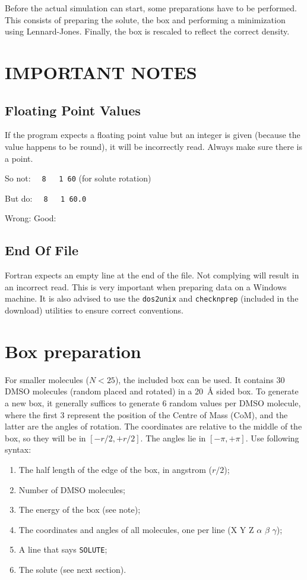 Before the actual simulation can start, some preparations have to be performed.
This consists of preparing the solute, the box and performing a minimization 
using Lennard-Jones. Finally, the box is rescaled to reflect the correct 
density.

\section{IMPORTANT NOTES}
\subsection{Floating Point Values}
If the program expects a floating point value but an integer is given (because 
the value happens to be round), it will be incorrectly read. Always make sure 
there is a point.

So not: \verb|  8   1 60| (for solute rotation)

But do: \verb|  8   1 60.0|

Wrong: \vispace{} \vispace\vispace{} 
 Good: \vispace{} \vispace\vispace{} 

\subsection{End Of File}
Fortran expects an empty line at the end of the file. Not complying will result 
in an incorrect read. This is very important when preparing data on a Windows 
machine. It is also advised to use the \verb|dos2unix| and \verb|checknprep| 
(included in the download) utilities to ensure correct conventions.

\section{Box preparation}
For smaller molecules ($N < 25$), the included box can be used. It contains 30 
DMSO molecules (random placed and rotated) in a \SI{20}{\angstrom} sided box.
To generate a new box, it generally suffices to generate 6 random values per 
DMSO molecule, where the first 3 represent the position of the Centre of Mass 
(CoM), and the latter are the angles of rotation. The coordinates are relative 
to the middle of the box, so they will be in $[-r/2, +r/2]$. The angles lie in 
$[-\pi, +\pi]$. Use following syntax:

\begin{enumerate}
	\item The half length of the edge of the box, in angstrom ($r/2$);
	\item Number of DMSO molecules;
	\item The energy of the box (see note);
	\item The coordinates and angles of all molecules, one per line (X Y Z 
	$\alpha$ $\beta$ $\gamma$);
	\item A line that says \verb|SOLUTE|;
	\item The solute (see next section).
\end{enumerate}

